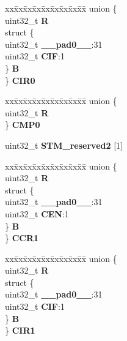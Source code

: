 \begin{DoxyCompactItemize}
\begin{tabbing}
\end{tabbing}\item 
\mbox{\label{structSTM__tag_ad0078def61bd68c923e090440ba38a75}} 
\begin{tabbing}
xx\=xx\=xx\=xx\=xx\=xx\=xx\=xx\=xx\=\kill
union \{\\
\>uint32\_t {\bfseries R}\\
\>struct \{\\
\>\>uint32\_t {\bfseries \_\_pad0\_\_}:31\\
\>\>uint32\_t {\bfseries CIF}:1\\
\>\} {\bfseries B}\\
\} {\bfseries CIR0}\\

\end{tabbing}\item 
\mbox{\label{structSTM__tag_a5691eb57644b4d7462361a854c025481}} 
\begin{tabbing}
xx\=xx\=xx\=xx\=xx\=xx\=xx\=xx\=xx\=\kill
union \{\\
\>uint32\_t {\bfseries R}\\
\} {\bfseries CMP0}\\

\end{tabbing}\item 
\mbox{\label{structSTM__tag_aea5461544a78a07df003fc715e211c77}} 
uint32\+\_\+t {\bfseries S\+T\+M\+\_\+reserved2} \mbox{[}1\mbox{]}
\item 
\mbox{\label{structSTM__tag_a0e09a70e3d5b2ddc723d0d554dd8ff1f}} 
\begin{tabbing}
xx\=xx\=xx\=xx\=xx\=xx\=xx\=xx\=xx\=\kill
union \{\\
\>uint32\_t {\bfseries R}\\
\>struct \{\\
\>\>uint32\_t {\bfseries \_\_pad0\_\_}:31\\
\>\>uint32\_t {\bfseries CEN}:1\\
\>\} {\bfseries B}\\
\} {\bfseries CCR1}\\

\end{tabbing}\item 
\mbox{\label{structSTM__tag_a2d59e5ece51fa167559e470438b8303c}} 
\begin{tabbing}
xx\=xx\=xx\=xx\=xx\=xx\=xx\=xx\=xx\=\kill
union \{\\
\>uint32\_t {\bfseries R}\\
\>struct \{\\
\>\>uint32\_t {\bfseries \_\_pad0\_\_}:31\\
\>\>uint32\_t {\bfseries CIF}:1\\
\>\} {\bfseries B}\\
\} {\bfseries CIR1}\\


\end{tabbing}
\end{DoxyCompactItemize}
